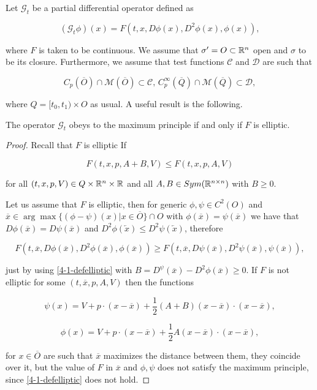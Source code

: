 Let $\mathcal{G}_t$ be a partial differential operator defined as

\begin{equation}\label{4-1-GPDEop}
    (\mathcal{G}_t\phi)(x) = F(t,x,D\phi(x), D^2\phi(x), \phi(x)),
\end{equation}

where $F$ is taken to be continuous. We assume that $\sigma'=O\subset\mathbb{R}^n$ open and $\sigma$ to be its closure. 
Furthermore, we assume that test functions $\mathcal{C}$ and $\mathcal{D}$ are such that

\begin{equation}\label{4-1-condonCandD}
    C_p(\overline{O})\cap\mathcal{M}(\overline{O}) \subset \mathcal{C},\,C_p^{\infty}(\overline{Q})\cap\mathcal{M}(\overline{Q}) \subset \mathcal{D},
\end{equation}

where $Q=[t_0,t_1)\times O$ as usual. A useful result is the following.

\begin{lemma}
    The operator $\mathcal{G}_t$ obeys to the maximum principle if and only if $F$ is elliptic.

    \begin{proof}
        Recall that $F$ is elliptic If

        \begin{equation}\label{4-1-defelliptic}
            F(t,x,p,A+B,V) \leq F(t,x,p,A,V)
        \end{equation}

        for all $(t,x,p,V)\in Q\times\mathbb{R}^n\times\mathbb{R}$ and all $A,B\in Sym(\mathbb{R}^{n\times n})$ with $B\geq0$.

        Let us assume that $F$ is elliptic, then for generic $\phi,\psi\in C^2(O)$ and $\overline{x}\in\arg \max\{(\phi-\psi)(x)|x\in\overline{O}\}\cap O$ 
        with $\phi(\overline{x})=\psi(\overline{x})$ we have that $D\phi(\overline{x})=D\psi(\overline{x})$ and $D^2\phi(\overleftarrow{x})\leq D^2\psi(\overleftarrow{x})$, 
        therefore

        \[F(t,\overline{x}, D\phi(\overline{x}), D^2\phi(\overline{x}),\phi(\overline{x}))\geq F(t,\overline{x}, D\psi(\overline{x}), D^2\psi(\overline{x}),\psi(\overline{x})),\]

        just by using \ref{4-1-defelliptic} with $B=D^\psi(\overline{x})-D^2\phi(\overline{x})\geq0$. If $F$ is not elliptic 
        for some $(t,\overline{x},p,A,V)$ then the functions

        \[\psi(x) = V+p\cdot(x-\overline{x}) + \frac{1}{2}(A+B)(x-\overline{x})\cdot(x-\overline{x}),\]

        \[\phi(x) = V+p\cdot(x-\overline{x}) + \frac{1}{2}A(x-\overline{x})\cdot(x-\overline{x}),\]

        for $x\in\overline{O}$ are such that $\overline{x}$ maximizes the distance between them, they coincide over it, but 
        the value of $F$ in $\overline{x}$ and $\phi,\psi$ does not satisfy the maximum principle, since \ref{4-1-defelliptic} 
        does not hold.
    \end{proof}
\end{lemma}

